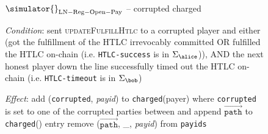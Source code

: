 \begin{figure}[H]
  \begin{simulatorbox}{$\simulator{}_{\mathrm{LN - Reg - Open - Pay}}$ --
  corrupted charged}
    \begin{algorithmic}[1]
      \Statex \textit{Condition}:
      \Indent
        \State \alice{} sent \textsc{updateFulfillHtlc} to a corrupted player
        and either (got the fulfillment of the HTLC irrevocably committed OR
        fulfilled the HTLC on-chain (i.e. \texttt{HTLC-success} is in
        $\Sigma_{\alice}$)), AND the next honest player \bob{} down the line
        successfully timed out the HTLC on-chain (i.e. \texttt{HTLC-timeout} is
        in $\Sigma_{\bob}$)
      \EndIndent
      \Statex

      \Statex \textit{Effect}:
      \Indent
        \State add (\texttt{corrupted}, \textit{payid}) to
        \texttt{charged}(payer) where \texttt{corrupted} is set to one of the
        corrupted parties between \alice{} and \bob{}
          \State append $\overrightarrow{\mathtt{path}}$ to
          \texttt{charged}(\alice) entry
        \EndIf
        \State remove ($\overrightarrow{\mathtt{path}}$, \_,
        \textit{payid}) from \texttt{payids}
      \EndIndent
    \end{algorithmic}
  \end{simulatorbox}
  \caption{}
  \label{alg:sim:resolvepay:corrupted:fig}
\end{figure}

